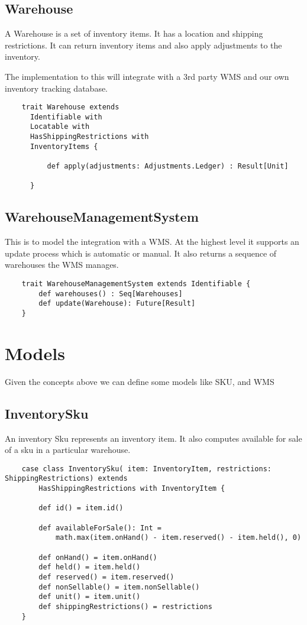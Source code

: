 \documentclass[11pt]{article}
\begin{document}
\subsection{Warehouse}

A Warehouse is a set of inventory items. It has a location and shipping restrictions.  
It can return inventory items and also apply adjustments to the inventory.

The implementation to this will integrate with a 3rd party WMS and our own inventory 
tracking database.

\begin{lstlisting}
    trait Warehouse extends 
      Identifiable with
      Locatable with
      HasShippingRestrictions with
      InventoryItems {

          def apply(adjustments: Adjustments.Ledger) : Result[Unit]
      
      }
\end{lstlisting}

\subsection{WarehouseManagementSystem}

This is to model the integration with a WMS. At the highest level it supports
an update process which is automatic or manual. It also returns a sequence of warehouses
the WMS manages.

\begin{lstlisting}
    trait WarehouseManagementSystem extends Identifiable { 
        def warehouses() : Seq[Warehouses]
        def update(Warehouse): Future[Result]
    }
\end{lstlisting}

\section{Models}

Given the concepts above we can define some models like SKU, and WMS 

\subsection{InventorySku}

An inventory Sku represents an inventory item. It also computes available for sale of a
sku in a particular warehouse.

\begin{lstlisting}
    case class InventorySku( item: InventoryItem, restrictions: ShippingRestrictions) extends 
        HasShippingRestrictions with InventoryItem {

        def id() = item.id()

        def availableForSale(): Int = 
            math.max(item.onHand() - item.reserved() - item.held(), 0)

        def onHand() = item.onHand()
        def held() = item.held()
        def reserved() = item.reserved()
        def nonSellable() = item.nonSellable()
        def unit() = item.unit()
        def shippingRestrictions() = restrictions
    }
\end{lstlisting}
\end{document}
